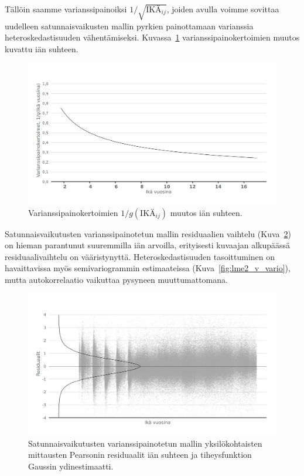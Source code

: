 \documentclass[finnish]{docopts}
\begin{document}
Tällöin saamme varianssipainoiksi $1/\sqrt{\text{IKÄ}_{ij}}$, joiden avulla voimme sovittaa uudelleen satunnaisvaikusten mallin pyrkien painottamaan varianssia heteroskedastisuuden vähentämiseksi. Kuvassa~\ref{fig:lme2_varfunc} varianssipainokertoimien muutos kuvattu iän suhteen. \\

\begin{figure}[H]
\centering
  \includegraphics[scale=0.8]{kuvaajat/lme2_varfunc.png}
  \caption{Varianssipainokertoimien $1/g(\text{IKÄ}_{ij})$ muutos iän suhteen.}
  \label{fig:lme2_varfunc}
\end{figure}

Satunnaisvaikutusten varianssipainotetun mallin residuaalien vaihtelu (Kuva~\ref{fig:lme2_ika_v_resid}) on hieman parantunut suuremmilla iän arvoilla, erityisesti kuvaajan alkupäässä residuaalivaihtelu on vääristynyttä. Heteroskedastisuuden tasoittuminen on havaittavissa myös semivariogrammin estimaateissa (Kuva~\ref{fig:lme2_v_vario}), mutta autokorrelaatio vaikuttaa pysyneen muuttumattomana.\\

\begin{figure}[H]
\centering
  \includegraphics[scale=0.8]{kuvaajat/lme2_ika_v_residuaalit.png}
  \caption{Satunnaisvaikutusten varianssipainotetun mallin yksilökohtaisten mittausten Pearsonin residuaalit iän suhteen ja tiheysfunktion Gaussin ydinestimaatti.}
  \label{fig:lme2_ika_v_resid}
\end{figure}
\end{document}
